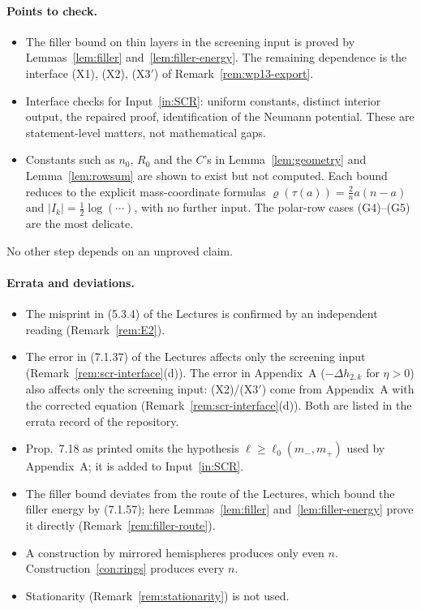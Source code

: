 \documentclass[11pt]{article}
\theoremstyle{definition}
\theoremstyle{remark}
\begin{document}
\paragraph{Points to check.}
\begin{itemize}[leftmargin=*]
\item The filler bound on thin layers in the screening input is proved by Lemmas~\ref{lem:filler} and~\ref{lem:filler-energy}. The remaining dependence is
  the interface (X1), (X2), (X3$'$) of Remark~\ref{rem:wp13-export}.
\item Interface checks for Input~\ref{in:SCR}: uniform constants, distinct interior
  output, the repaired proof, identification of the Neumann potential. These are statement-level
  matters, not mathematical gaps.
\item Constants such as $n_0$, $R_0$ and the $C$'s in Lemma~\ref{lem:geometry} and
  Lemma~\ref{lem:rowsum} are shown to exist but not computed. Each bound reduces to the explicit
  mass-coordinate formulas $\varrho(\tau(a))=\frac2na(n-a)$ and $|I_k|=\frac12\log(\cdots)$, with
  no further input. The polar-row cases (G4)--(G5) are the most delicate.
\end{itemize}
No other step depends on an unproved claim.

\paragraph{Errata and deviations.}
\begin{itemize}[leftmargin=*]
\item The misprint in (5.3.4) of the Lectures is confirmed by an independent reading (Remark~\ref{rem:E2}).
\item The error in (7.1.37) of the Lectures affects only the screening input (Remark~\ref{rem:scr-interface}(d)). The error in Appendix~A
  ($-\Delta h_{2,k}$ for $\eta>0$) also affects only the screening input: (X2)/(X3$'$) come from Appendix~A with the corrected equation
  (Remark~\ref{rem:scr-interface}(d)). Both are listed in the errata record of the repository.
\item Prop.~7.18 as printed omits the hypothesis $\ell\ge\ell_0(m_-,m_+)$ used by Appendix~A; it is added
  to Input~\ref{in:SCR}.
\item The filler bound deviates from the route of the Lectures, which bound the filler energy by
  (7.1.57); here Lemmas~\ref{lem:filler} and~\ref{lem:filler-energy} prove it directly
  (Remark~\ref{rem:filler-route}).
\item A construction by mirrored hemispheres produces only even $n$. Construction~\ref{con:rings}
  produces every $n$.
\item Stationarity (Remark~\ref{rem:stationarity}) is not used.
\end{itemize}
\end{document}
